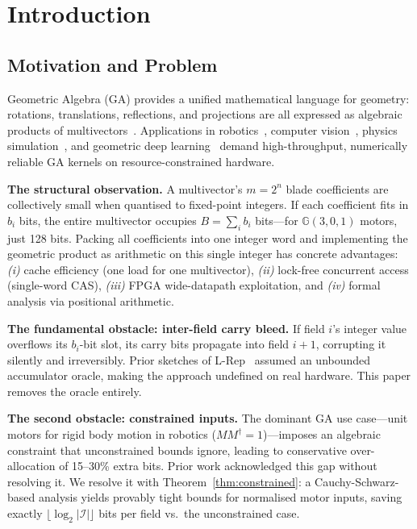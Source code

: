 \documentclass[11pt,a4paper]{article}
\theoremstyle{definition}
\theoremstyle{plain}
\theoremstyle{remark}
\newcommand{\GA}{\mathbb{G}}
\begin{document}
\tableofcontents
\newpage

\section{Introduction}
\label{sec:intro}

\subsection{Motivation and Problem}

Geometric Algebra (GA) provides a unified mathematical language for geometry:
rotations, translations, reflections, and projections are all expressed as
algebraic products of multivectors~\cite{hestenes1984,dorst2007}.
Applications in robotics~\cite{selig2005}, computer vision~\cite{lasenby1998},
physics simulation~\cite{doran2003}, and geometric deep
learning~\cite{brandstetter2023,ruhe2023} demand high-throughput,
numerically reliable GA kernels on resource-constrained hardware.

\textbf{The structural observation.}
A multivector's $m=2^n$ blade coefficients are collectively small when
quantised to fixed-point integers.
If each coefficient fits in $b_i$ bits, the entire multivector occupies
$B=\sum_i b_i$ bits---for $\GA(3,0,1)$ motors, just 128 bits.
Packing all coefficients into one integer word and implementing the geometric
product as arithmetic on this single integer has concrete advantages:
\emph{(i)} cache efficiency (one load for one multivector),
\emph{(ii)} lock-free concurrent access (single-word CAS),
\emph{(iii)} FPGA wide-datapath exploitation, and
\emph{(iv)} formal analysis via positional arithmetic.

\textbf{The fundamental obstacle: inter-field carry bleed.}
If field $i$'s integer value overflows its $b_i$-bit slot, its carry bits
propagate into field $i+1$, corrupting it silently and irreversibly.
Prior sketches of L-Rep~\cite{dang2025sketch} assumed an unbounded
accumulator oracle, making the approach undefined on real hardware.
This paper removes the oracle entirely.

\textbf{The second obstacle: constrained inputs.}
The dominant GA use case---unit motors for rigid body motion in robotics
($MM^\dagger=1$)---imposes an algebraic constraint that unconstrained
bounds ignore, leading to conservative over-allocation of 15--30\% extra
bits.
Prior work acknowledged this gap without resolving it.
We resolve it with Theorem~\ref{thm:constrained}: a Cauchy-Schwarz-based
analysis yields provably tight bounds for normalised motor inputs, saving
exactly $\lfloor\log_2|\mathcal{I}|\rfloor$ bits per field vs.\ the
unconstrained case.
\end{document}
